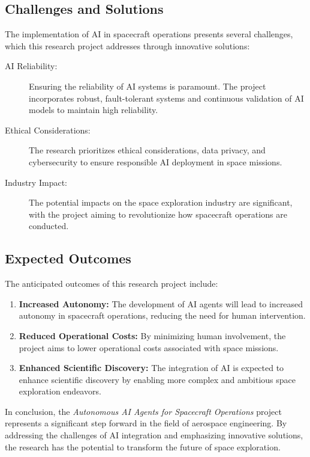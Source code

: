 \documentclass[a4paper,12pt]{article}
\begin{document}
\subsection{Challenges and Solutions}

The implementation of AI in spacecraft operations presents several challenges, which this research project addresses through innovative solutions:

\begin{description}
    \item[AI Reliability:] Ensuring the reliability of AI systems is paramount. The project incorporates robust, fault-tolerant systems and continuous validation of AI models to maintain high reliability.
    \item[Ethical Considerations:] The research prioritizes ethical considerations, data privacy, and cybersecurity to ensure responsible AI deployment in space missions.
    \item[Industry Impact:] The potential impacts on the space exploration industry are significant, with the project aiming to revolutionize how spacecraft operations are conducted.
\end{description}

\subsection{Expected Outcomes}

The anticipated outcomes of this research project include:

\begin{enumerate}
    \item \textbf{Increased Autonomy:} The development of AI agents will lead to increased autonomy in spacecraft operations, reducing the need for human intervention.
    \item \textbf{Reduced Operational Costs:} By minimizing human involvement, the project aims to lower operational costs associated with space missions.
    \item \textbf{Enhanced Scientific Discovery:} The integration of AI is expected to enhance scientific discovery by enabling more complex and ambitious space exploration endeavors.
\end{enumerate}

In conclusion, the \textit{Autonomous AI Agents for Spacecraft Operations} project represents a significant step forward in the field of aerospace engineering. By addressing the challenges of AI integration and emphasizing innovative solutions, the research has the potential to transform the future of space exploration.
\end{document}
